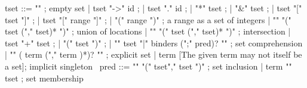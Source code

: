 \begin{syntax}
  tset ::= "\empty" ; empty set
       | tset "->" id ;
       | tset "." id ;
       | "*" tset ;
       | "&" tset ;
       | tset "[" tset "]" ;
       | tset "[" range "]" ;
       | "(" range ")" ; a range as a set of integers
       | "\union" "(" tset ("," tset)* ")" ; union of locations
       | "\inter" "(" tset ("," tset)* ")" ; intersection
       | tset "+" tset ;
       | "(" tset ")" ;
       | "{" tset "|" binders (";" pred)? "}" ; set comprehension
       | "{" ( term ("," term )*)? "}" ; explicit set
       | term [The given term may not itself be a set]; implicit singleton
       \
  pred ::= "\subset" "(" tset"," tset ")" ; set inclusion
       | term "\in" tset ; set membership
\end{syntax}

